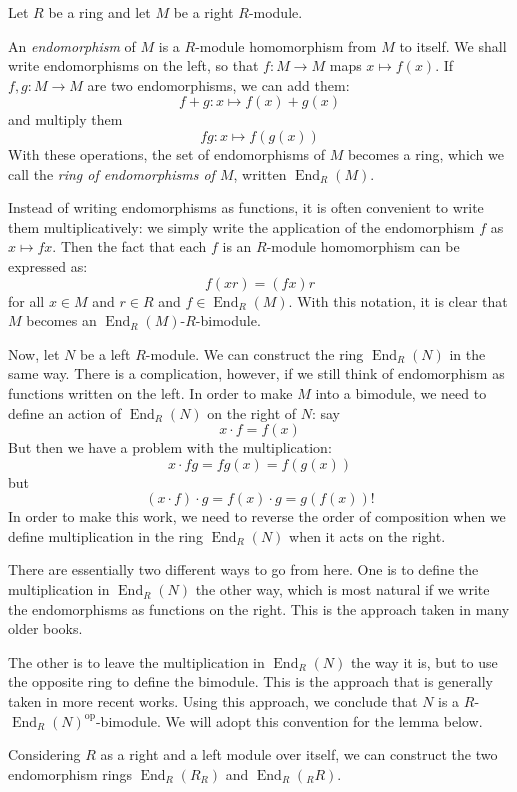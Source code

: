 \documentclass[12pt]{article}
\newcommand{\End}{\operatorname{End}}
\begin{document}

Let $R$ be a ring and let $M$ be a right $R$-module.

An \emph{endomorphism} of $M$ is a $R$-module homomorphism from $M$ to itself.
We shall write endomorphisms on the left,
so that $f : M \to M$ maps $x \mapsto f(x)$.
If $f,g : M \to M$ are two endomorphisms, we can add them:
$$ f+g : x \mapsto f(x) + g(x) $$
and multiply them
$$ fg : x \mapsto f(g(x)) $$
With these operations, the set of endomorphisms of $M$ becomes a ring, which we call
the \emph{ring of endomorphisms of $M$}, written $\End_R(M)$.

Instead of writing endomorphisms as functions, it is often convenient
to write them multiplicatively: we simply write the application of the
endomorphism $f$ as $x \mapsto fx$.  Then the fact that each $f$ is an $R$-module homomorphism can be expressed as:
$$f(xr) = (fx)r$$
for all $x \in M$ and $r \in R$ and $f \in \End_R(M)$.
With this notation, it is clear that $M$ becomes an $\End_R(M)$-$R$-bimodule.

Now, let $N$ be a left $R$-module.  We can construct the ring $\End_R(N)$ in the same way.
There is a complication, however, if we still think of endomorphism as functions written
on the left.  In order to make $M$ into a bimodule, we need to define an action of
$\End_R(N)$ on the right of $N$: say
$$ x\cdot f = f(x) $$
But then we have a problem with the multiplication:
$$ x \cdot fg = fg(x) = f(g(x)) $$
but $$(x \cdot f) \cdot g = f(x) \cdot g = g(f(x))!$$
In order to make this work, we need to reverse the order of composition
when we define multiplication in the ring $\End_R(N)$ when it acts on the right.

There are essentially two different ways to go from here.  One is to define the multiplication
in $\End_R(N)$ the other way, which is most natural if we write the endomorphisms as functions
on the right.  This is the approach taken in many older books.

The other is to leave the
multiplication in $\End_R(N)$ the way it is, but to use the opposite ring to define the bimodule.
This is the approach that is generally taken in more recent works.  Using this approach,
we conclude that $N$ is a $R$-$\End_R(N)^{\text{op}}$-bimodule.   We will adopt this convention
for the lemma below.

Considering $R$ as a right and a left module over itself,
we can construct the two endomorphism rings $\End_R(R_R)$ and $\End_R({}_RR)$.
\end{document}

